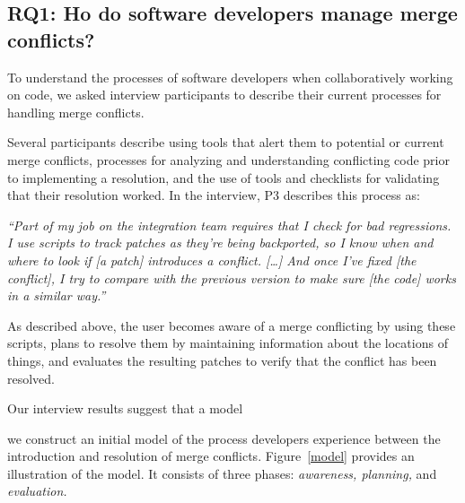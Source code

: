 
\subsection{\textbf{RQ1:} Ho do software developers manage merge conflicts?}\label{RQ1}

To understand the processes of software developers when collaboratively working on code, we asked interview participants to describe their current processes for handling merge conflicts.

Several participants describe using tools that alert them to potential or current merge conflicts, processes for analyzing and understanding conflicting code prior to implementing a resolution, and the use of tools and checklists for validating that their resolution worked.
In the interview, P3 describes this process as:
\begin{quoting}
\textit{``Part of my job on the integration team requires that I check for bad regressions. I use scripts to track patches as they're being backported, so I know when and where to look if [a patch] introduces a conflict. [\ldots] And once I've fixed [the conflict], I try to compare with the previous version to make sure [the code] works in a similar way.''}
\end{quoting}
As described above, the user becomes aware of a merge conflicting by using these scripts, plans to resolve them by maintaining information about the locations of things, and evaluates the resulting patches to verify that the conflict has been resolved.

Our interview results suggest that a model 

 we construct an initial model of the process developers experience between the introduction and resolution of merge conflicts.
Figure~\ref{model} provides an illustration of the model.
It consists of three phases: \emph{awareness, planning,} and \emph{evaluation.}

